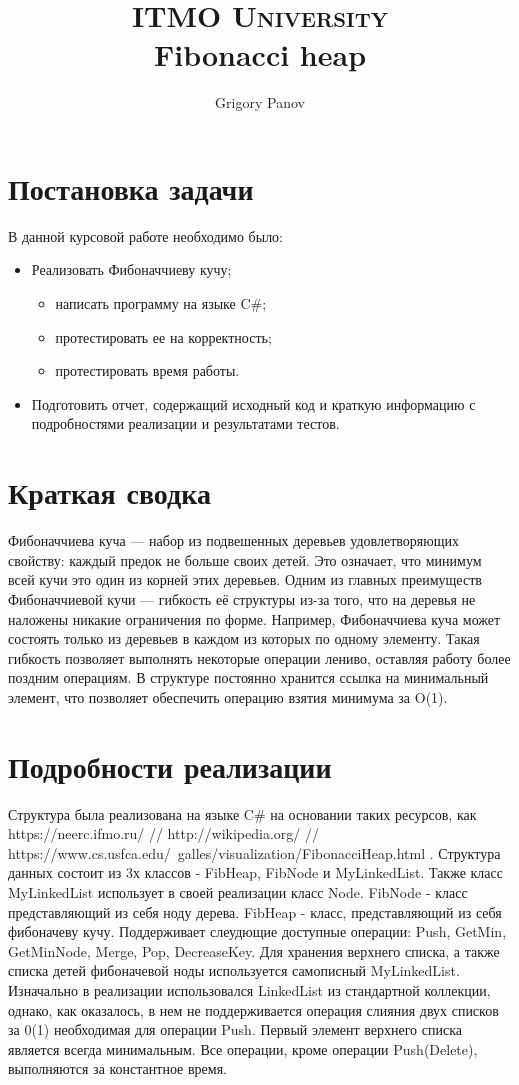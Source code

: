 \documentclass[article, a4paper]{llncs}
\title{
		\usefont{OT1}{bch}{b}{n}
		\normalfont \normalsize \textsc{ITMO University} \\ [25pt]
		\huge Fibonacci heap \\
}
\author{
		\normalfont 								
		\normalsize
        Grigory Panov\\[-5pt]		
        \normalsize
}
\institute{
\today
}
\date{}
\newcommand{\Csh}{C{\lserif\#}}
\begin{document}
\maketitle
    \section{Постановка задачи}
    В данной курсовой работе необходимо было:
    \begin{itemize}
        \item Реализовать Фибоначчиеву кучу;
            \begin{itemize}
                \item написать программу на языке \Csh{};
                \item протестировать ее на корректность;
                \item протестировать время работы.
            \end{itemize}
        \item Подготовить отчет, содержащий исходный код и краткую информацию с подробностями реализации и результатами тестов.
    \end{itemize}
    
    \section{Краткая сводка}
    Фибоначчиева куча — набор из подвешенных деревьев удовлетворяющих свойству: каждый предок не больше своих детей. Это означает, что минимум всей кучи это один из корней этих деревьев. Одним из главных преимуществ Фибоначчиевой кучи — гибкость её структуры из-за того, что на деревья не наложены никакие ограничения по форме. Например, Фибоначчиева куча может состоять только из деревьев в каждом из которых по одному элементу. Такая гибкость позволяет выполнять некоторые операции лениво, оставляя работу более поздним операциям. В структуре постоянно хранится ссылка на минимальный элемент, что позволяет обеспечить операцию взятия минимума за O(1). 
    \section{Подробности реализации} 
    Структура была реализована на языке \Csh{} на основании таких ресурсов, как https://neerc.ifmo.ru/  // http://wikipedia.org/ // https://www.cs.usfca.edu/~galles/visualization/FibonacciHeap.html . Структура данных состоит из 3х классов - FibHeap, FibNode и MyLinkedList. Также класс MyLinkedList использует в своей реализации класс Node.
    FibNode - класс представляющий из себя ноду дерева. FibHeap - класс, представляющий из себя фибоначеву кучу. Поддерживает слеудющие доступные операции: Push, GetMin, GetMinNode, Merge, Pop, DecreaseKey. Для хранения верхнего списка, а также списка детей фибоначевой ноды используется самописный MyLinkedList. Изначально в реализации использовался LinkedList из стандартной коллекции, однако, как оказалось, в нем не поддерживается операция слияния двух списков за 0(1) необходимая для операции Push. Первый элемент верхнего списка является всегда минимальным. Все операции, кроме операции Push(Delete), выполняются за константное время.
\end{document}
